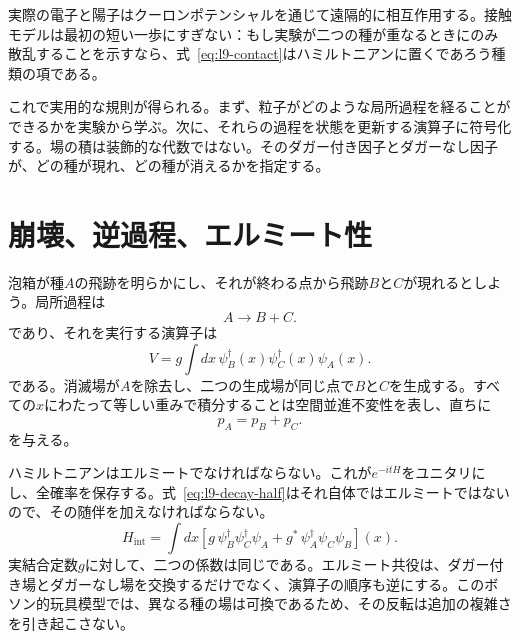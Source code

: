 実際の電子と陽子はクーロンポテンシャルを通じて遠隔的に相互作用する。接触モデルは最初の短い一歩にすぎない：もし実験が二つの種が重なるときにのみ散乱することを示すなら、式~\eqref{eq:l9-contact}はハミルトニアンに置くであろう種類の項である。

\begin{classroomqa}
\end{classroomqa}

これで実用的な規則が得られる。まず、粒子がどのような局所過程を経ることができるかを実験から学ぶ。次に、それらの過程を状態を更新する演算子に符号化する。場の積は装飾的な代数ではない。そのダガー付き因子とダガーなし因子が、どの種が現れ、どの種が消えるかを指定する。

\section{崩壊、逆過程、エルミート性}

泡箱が種\(A\)の飛跡を明らかにし、それが終わる点から飛跡\(B\)と\(C\)が現れるとしよう。局所過程は
\begin{equation}
A\longrightarrow B+C.
\end{equation}
であり、それを実行する演算子は
\begin{equation}
V=g\int dx\,
\psi_B^\dagger(x)\psi_C^\dagger(x)\psi_A(x).
\label{eq:l9-decay-half}
\end{equation}
である。消滅場が\(A\)を除去し、二つの生成場が同じ点で\(B\)と\(C\)を生成する。すべての\(x\)にわたって等しい重みで積分することは空間並進不変性を表し、直ちに
\begin{equation}
p_A=p_B+p_C.
\end{equation}
を与える。

ハミルトニアンはエルミートでなければならない。これが\(e^{-itH}\)をユニタリにし、全確率を保存する。式~\eqref{eq:l9-decay-half}はそれ自体ではエルミートではないので、その随伴を加えなければならない。
\begin{equation}
H_{\mathrm{int}}
=\int dx\left[
g\,\psi_B^\dagger\psi_C^\dagger\psi_A
+g^*\,\psi_A^\dagger\psi_C\psi_B
\right](x).
\label{eq:l9-hermitian-vertex}
\end{equation}
実結合定数\(g\)に対して、二つの係数は同じである。エルミート共役は、ダガー付き場とダガーなし場を交換するだけでなく、演算子の順序も逆にする。このボソン的玩具模型では、異なる種の場は可換であるため、その反転は追加の複雑さを引き起こさない。

